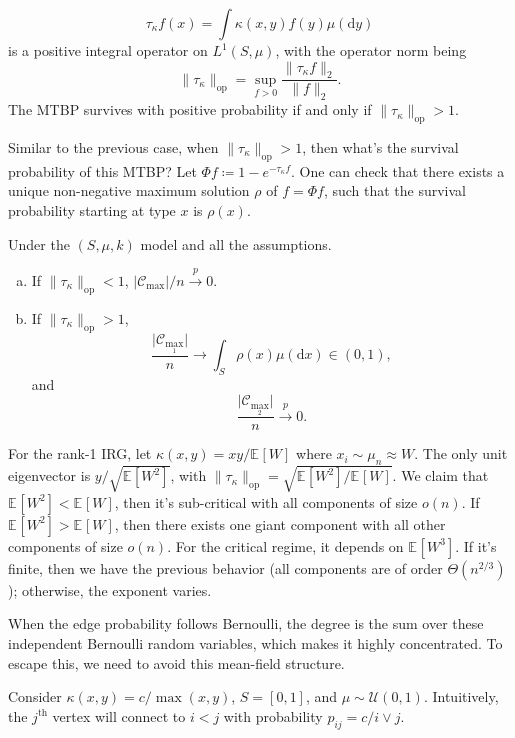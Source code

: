 \begin{intuition}
	\[
		\tau _\kappa f(x)
		= \int \kappa (x, y) f(y) \mu (\mathrm{d} y)
	\]
	is a positive integral operator on \(L^1(S, \mu )\), with the operator norm being
	\[
		\lVert \tau _{\kappa } \rVert _{\mathrm{op} }
		= \sup _{f > 0} \frac{\lVert \tau _\kappa f \rVert _2}{\lVert f \rVert _2}.
	\]
	The MTBP survives with positive probability if and only if \(\lVert \tau _{\kappa } \rVert _{\mathrm{op} } > 1\).

	Similar to the previous case, when \(\lVert \tau _{\kappa } \rVert _{\mathrm{op} } > 1\), then what's the survival probability of this MTBP? Let \(\Phi f \coloneqq 1 - e^{- \tau _{\kappa } f}\). One can check that there exists a unique non-negative maximum solution \(\rho \) of \(f = \Phi f\), such that the survival probability starting at type \(x\) is \(\rho (x)\).

	\begin{theorem}
		Under the \((S, \mu , k)\) model and all the assumptions.
		\begin{enumerate}[(a)]
			\item If \(\lVert \tau _{\kappa } \rVert _{\mathrm{op} } < 1\), \(\lvert \mathcal{C} _{\max } \rvert / n \overset{p}{\to} 0\).
			\item If \(\lVert \tau _{\kappa } \rVert _{\mathrm{op} } > 1\),
			      \[
				      \frac{\lvert \mathcal{C} _{\max _1} \rvert }{n}
				      \to \int _S \rho (x) \mu (\mathrm{d} x) \in (0, 1),
			      \]
			      and
			      \[
				      \frac{\lvert \mathcal{C} _{\max _2} \rvert }{n} \overset{p}{\to} 0.
			      \]
		\end{enumerate}
	\end{theorem}
\end{intuition}

\begin{eg}
	For the rank-1 IRG, let \(\kappa (x, y) = xy / \mathbb{E}_{}[W] \) where \(x_i \sim \mu _n \approx W\). The only unit eigenvector is \(y / \sqrt{\mathbb{E}_{}[W^2] } \), with \(\lVert \tau _{\kappa } \rVert _{\mathrm{op} }= \sqrt{\mathbb{E}_{}[W^2] / \mathbb{E}_{}[W] } \). We claim that \(\mathbb{E}_{}[W^2] < \mathbb{E}_{}[W] \), then it's sub-critical with all components of size \(o(n)\). If \(\mathbb{E}_{}[W^2] > \mathbb{E}_{}[W] \), then there exists one giant component with all other components of size \(o(n)\). For the critical regime, it depends on \(\mathbb{E}_{}[W^3] \). If it's finite, then we have the previous behavior (all components are of order \(\Theta (n^{2 / 3})\)); otherwise, the exponent varies.
\end{eg}

\begin{remark}
	When the edge probability follows Bernoulli, the degree is the sum over these independent Bernoulli random variables, which makes it highly concentrated. To escape this, we need to avoid this mean-field structure.
\end{remark}

\begin{eg}
	Consider \(\kappa (x, y) = c / \max (x, y)\), \(S = [0, 1]\), and \(\mu \sim \mathcal{U} (0, 1)\). Intuitively, the \(j^{\text{th} }\) vertex will connect to \(i < j\) with probability \(p_{ij} = c / i \vee j\).
\end{eg}